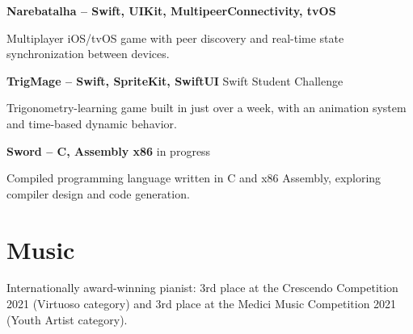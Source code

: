 \documentclass[11pt,a4paper]{article}
\newcommand{\entrysimple}[2]{%
  \textbf{#1} \hfill {\color{muted}#2}\par\vspace{2pt}}
\begin{document}
\entrysimple{Narebatalha \textnormal{\color{muted}-- Swift, UIKit, MultipeerConnectivity, tvOS}}{}
Multiplayer iOS/tvOS game with peer discovery and real-time state synchronization between devices.
\vspace{3pt}

\entrysimple{TrigMage \textnormal{\color{muted}-- Swift, SpriteKit, SwiftUI}}{Swift Student Challenge}
Trigonometry-learning game built in just over a week, with an animation system and time-based dynamic behavior.
\vspace{3pt}

\entrysimple{Sword \textnormal{\color{muted}-- C, Assembly x86}}{in progress}
Compiled programming language written in C and x86 Assembly, exploring compiler design and code generation.

\section{Music}
Internationally award-winning pianist: 3rd place at the Crescendo Competition 2021 (Virtuoso category)
and 3rd place at the Medici Music Competition 2021 (Youth Artist category).
\end{document}
